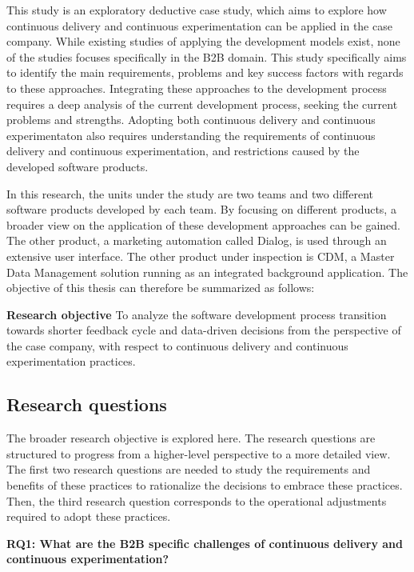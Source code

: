 \documentclass[english]{tktltiki2}
\theoremstyle{definition}
\theoremstyle{remark}
\begin{document}
This study is an exploratory deductive case study, which aims to explore how continuous delivery and continuous experimentation can be applied in the case company. While existing studies of applying the development models exist, none of the studies focuses specifically in the B2B domain. This study specifically aims to identify the main requirements, problems and key success factors with regards to these approaches. Integrating these approaches to the development process requires a deep analysis of the current development process, seeking the current problems and strengths. Adopting both continuous delivery and continuous experimentaton also requires understanding the requirements of continuous delivery and continuous experimentation, and restrictions caused by the developed software products. 

In this research, the units under the study are two teams and two different software products developed by each team. By focusing on different products, a broader view on the application of these development approaches can be gained. The other product, a marketing automation called Dialog, is used through an extensive user interface. The other product under inspection is CDM, a Master Data Management \cite{loshin2010master} solution running as an integrated background application. The objective of this thesis can therefore be summarized as follows:

\bigskip
\noindent \textbf{Research objective}
To analyze the software development process transition towards shorter feedback cycle and data-driven decisions from the perspective of the case company, with respect to continuous delivery and continuous experimentation practices.

\subsection{Research questions}

The broader research objective is explored here. The research questions are structured to progress from a higher-level perspective to a more detailed view. The first two research questions are needed to study the requirements and benefits of these practices to rationalize the decisions to embrace these practices. Then, the third research question corresponds to the operational adjustments required to adopt these practices. \newline

\noindent \textbf{RQ1: What are the B2B specific challenges of continuous delivery and continuous experimentation?}
\end{document}
